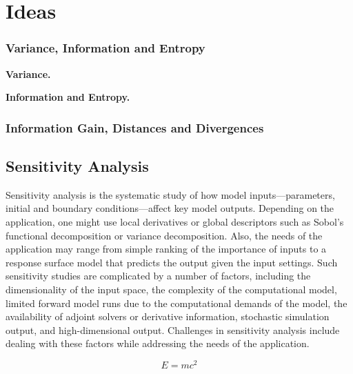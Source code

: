 \chapter{Ideas}\label{apendiceB}

\subsection{Variance, Information and Entropy}

\textbf{Variance.} 

\textbf{Information and Entropy.}

\subsection{Information Gain, Distances and Divergences}

\section{Sensitivity Analysis}
Sensitivity analysis is the systematic study of how model inputs—parameters, initial and boundary conditions—affect key model outputs. Depending on the application, one might use local derivatives or global descriptors such as Sobol’s functional decomposition or variance decomposition. Also, the needs of the application may range from simple ranking of the importance of inputs to a response surface model that predicts the output given the input settings. Such sensitivity studies are complicated by a number of factors, including the dimensionality of the input space, the complexity of the computational model, limited forward model runs due to the computational demands of the model, the availability of adjoint solvers or derivative information, stochastic simulation output, and high-dimensional output. Challenges in sensitivity analysis include dealing with these factors while addressing the needs of the application. \cite{DEnergy2009}

\begin{equation}
E=mc^2
\end{equation}

